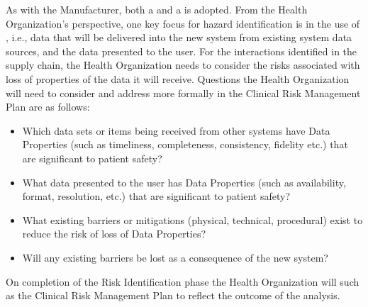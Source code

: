 As with the Manufacturer, both a  and a  is adopted. From the Health Organization's perspective, one key focus for hazard identification is in the use of , i.e., data that will be delivered into the new system from existing system data sources, and the data presented to the user. For the interactions identified in the supply chain, the Health Organization needs to consider the risks associated with loss of properties of the data it will receive. Questions the Health Organization will need to consider and address more formally in the Clinical Risk Management Plan are as follows:
\clearpage%
\begin{itemize}
  \item Which data sets or items being received from other systems have Data Properties (such as timeliness, completeness, consistency, fidelity etc.) that are significant to patient safety? 
  \item What data presented to the user has Data Properties (such as availability, format, resolution, etc.) that are significant to patient safety?
  \item What existing barriers or mitigations (physical, technical, procedural) exist to reduce the risk of loss of Data Properties?
  \item
  Will any existing barriers be lost as a consequence of the new system?
\end{itemize}

On completion of the Risk Identification phase the Health Organization will  such as the Clinical Risk Management Plan to reflect the outcome of the analysis.

